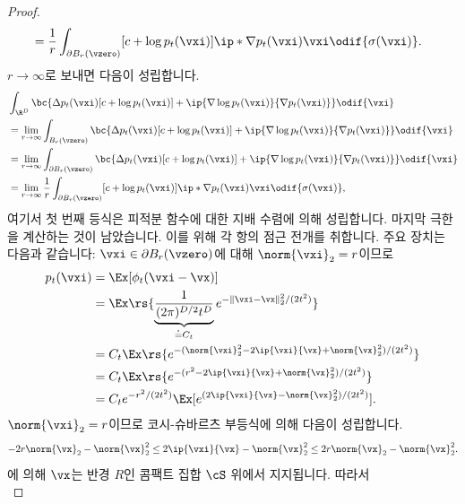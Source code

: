 \documentclass[../../book-main_ko.tex]{subfiles}
\begin{document}
\begin{proof}
\begin{align}
        &= \frac{1}{r}\int_{\partial B_{r}(\vzero)}[c + \log p_{t}(\vxi)]\ip*{\nabla p_{t}(\vxi)}{\vxi}\odif{\sigma(\vxi)}.
    \end{align}
    \(r \to \infty\)로 보내면 다음이 성립합니다.
    \begin{align}
        &\int_{\R^{D}}\bc{\Delta p_{t}(\vxi)[c + \log p_{t}(\vxi)] + \ip{\nabla \log p_{t}(\vxi)}{\nabla p_{t}(\vxi)}}\odif{\vxi} \label{eq:app_diffusion_r_infinity_limit} \\
        &= \lim_{r \to \infty}\int_{B_{r}(\vzero)}\bc{\Delta p_{t}(\vxi)[c + \log p_{t}(\vxi)] + \ip{\nabla \log p_{t}(\vxi)}{\nabla p_{t}(\vxi)}}\odif{\vxi} \\
        &= \lim_{r \to \infty}\int_{\partial B_{r}(\vzero)}\bc{\Delta p_{t}(\vxi)[c + \log p_{t}(\vxi)] + \ip{\nabla \log p_{t}(\vxi)}{\nabla p_{t}(\vxi)}}\odif{\vxi} \\
        &= \lim_{r \to \infty}\frac{1}{r}\int_{\partial B_{r}(\vzero)}[c + \log p_{t}(\vxi)]\ip*{\nabla p_{t}(\vxi)}{\vxi}\odif{\sigma(\vxi)},
    \end{align}
    여기서 첫 번째 등식은 피적분 함수에 대한 지배 수렴에 의해 성립합니다. 마지막 극한을 계산하는 것이 남았습니다. 이를 위해 각 항의 점근 전개를 취합니다. 주요 장치는 다음과 같습니다: \(\vxi \in \partial B_{r}(\vzero)\)에 대해 \(\norm{\vxi}_{2} = r\)이므로
    \begin{align}
        p_{t}(\vxi)
        &= \Ex[\phi_{t}(\vxi - \vx)] \\
        &= \Ex\rs{\underbrace{\frac{1}{(2\pi)^{D/2}t^{D}}}_{\doteq C_{t}}e^{-\|\vxi - \vx\|_{2}^{2}/(2t^{2})}} \\
        &= C_{t}\Ex\rs{e^{-(\norm{\vxi}_{2}^{2} - 2\ip{\vxi}{\vx} + \norm{\vx}_{2}^{2})/(2t^{2})}} \\
        &= C_{t}\Ex\rs{e^{-(r^{2} - 2\ip{\vxi}{\vx} + \norm{\vx}_{2}^{2})/(2t^{2})}} \\
        &= C_{t}e^{-r^{2}/(2t^{2})}\Ex[e^{(2\ip{\vxi}{\vx} - \norm{\vx}_{2}^{2})/(2t^{2})}].
    \end{align}
    \(\norm{\vxi}_{2} = r\)이므로 코시-슈바르츠 부등식에 의해 다음이 성립합니다.
    \begin{equation}
        -2r\norm{\vx}_{2} - \norm{\vx}_{2}^{2} \leq 2\ip{\vxi}{\vx} - \norm{\vx}_{2}^{2} \leq 2r\norm{\vx}_{2} - \norm{\vx}_{2}^{2}.
    \end{equation}
    에 의해 \(\vx\)는 반경 \(R\)인 콤팩트 집합 \(\cS\) 위에서 지지됩니다. 따라서
    \begin{equation}

\end{equation}
\end{proof}
\end{document}
